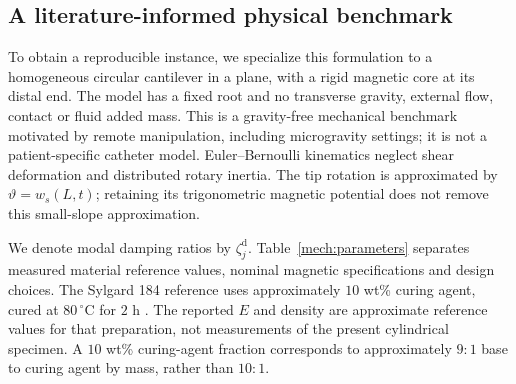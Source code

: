 \subsection{A literature-informed physical benchmark}
\label{mech:benchmark}
To obtain a reproducible instance, we specialize this formulation to a
homogeneous circular cantilever in a plane, with a rigid magnetic core
at its distal end. The model has a fixed root and no transverse gravity,
external flow, contact or fluid added mass. This is a gravity-free
mechanical benchmark motivated by remote manipulation, including
microgravity settings; it is not a patient-specific catheter model.
Euler--Bernoulli kinematics neglect shear deformation and distributed
rotary inertia. The tip rotation is approximated by
$\vartheta=w_s(L,t)$; retaining its trigonometric magnetic potential
does not remove this small-slope approximation.

We denote modal damping ratios by $\zeta_j^{\mathrm{d}}$.
Table~\ref{mech:parameters} separates measured material reference
values, nominal magnetic specifications and design choices. The Sylgard
184 reference uses approximately $10$ wt\% curing agent, cured at
$80\,^{\circ}\mathrm C$ for $2$ h \citep{cho2021pdms}. The reported
$E$ and density are approximate reference values for that preparation,
not measurements of the present cylindrical specimen. A $10$ wt\%
curing-agent fraction corresponds to approximately $9{:}1$ base to
curing agent by mass, rather than $10{:}1$.

